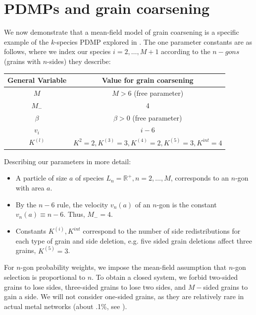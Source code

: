 \section{PDMPs and grain coarsening}\label{applygrain}
We now demonstrate that a mean-field model of grain coarsening is a specific example of the $k$-species PDMP explored in \cite{klob2013pdmp1} .  The one parameter constants are as follows, where we index our species $i = 2, \dots, M+1$ according to the $n-gons$ (grains with $n$-sides) they describe:
 
 \begin{centering}
 \begin{tabular}{|c|c|}\hline
General Variable & Value for grain coarsening \\\hline
$M$ & $M>6$ (free parameter)\\\hline
$M_-$ & 4 \\\hline
$\beta$ & $\beta>0$ (free parameter) \\\hline
$v_i$&$i-6 $  \\\hline
$K^{(l)}$&$K^{2}=2, K^{(3)} = 3, K^{(4)}= 2, K^{(5)}= 3, K^{int} = 4$ \\\hline
\end{tabular}

\end{centering}
\vspace{10 pt}
Describing our parameters in more detail:
\begin{itemize}
\item A particle of size $a$ of species $L_n = \mathbb{R}^+, n = 2 ,\dots, M$, corresponds to an $n$-gon with area $a$. 
\item By the $n-6$ rule, the velocity $v_n(a)$ of an $n$-gon is the constant $v_n(a) \equiv n-6$. Thus, $M_- = 4$.
\item Constants $K^{(i)},K^{int}$ correspond to the number of side redistributions for each type of grain  and side deletion, e.g.  five sided grain deletions affect three grains, $K^{(5)} = 3$.     
\end{itemize}

For $n$-gon probability weights, we impose the mean-field assumption that  $n$-gon selection is proportional to $n$.  To obtain a closed system, we forbid two-sided grains to lose sides, three-sided grains to lose two sides, and $M-$sided grains to gain a side. We will not consider one-sided grains, as they are relatively rare in actual metal networks (about .1\%, see \cite{fradkov1985experimental}).  

